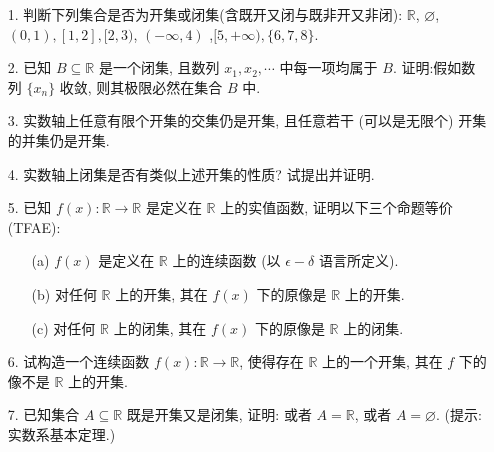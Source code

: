 \begin{enumerate}
    \item[1.]判断下列集合是否为开集或闭集(含既开又闭与既非开又非闭): $\mathbb{R}$, $\displaystyle\varnothing$, $(0,1),[1,2],[2,3)$, $(- \infty ,4)$ ,$[5,+\infty),\{6,7,8\}$.

    \item[2.]已知 $B\subseteq \mathbb{R}$ 是一个闭集, 且数列 $x_{1},x_{2},\cdots$ 中每一项均属于 $B$. 证明:假如数列 $\{x_{n}\}$ 收敛, 则其极限必然在集合 $B$ 中.

    \item[3.]实数轴上任意有限个开集的交集仍是开集, 且任意若干 (可以是无限个) 开集的并集仍是开集.

    \item[4.]实数轴上闭集是否有类似上述开集的性质? 试提出并证明.

    \item[5.]已知 $f(x): \mathbb{R} \to \mathbb{R}$ 是定义在 $\mathbb{R}$ 上的实值函数, 证明以下三个命题等价(TFAE):
        \begin{enumerate}  
            \item[(a)] $f(x)$ 是定义在 $\mathbb{R}$ 上的连续函数 (以 $\epsilon - \delta$ 语言所定义).
            \item[(b)]对任何 $\mathbb{R}$ 上的开集, 其在 $f(x)$ 下的原像是 $\mathbb{R}$ 上的开集.
            \item[(c)]对任何 $\mathbb{R}$ 上的闭集, 其在 $f(x)$ 下的原像是 $\mathbb{R}$ 上的闭集.   
        \end{enumerate}

    \item[6.]试构造一个连续函数 $f(x): \mathbb{R} \to \mathbb{R}$, 使得存在 $\mathbb{R}$ 上的一个开集, 其在 $f$ 下的像不是 $\mathbb{R}$ 上的开集.

    \item[7.]已知集合 $A \subseteq \mathbb{R}$ 既是开集又是闭集, 证明: 或者 $A = \mathbb{R}$, 或者 $A = \varnothing$. (提示: 实数系基本定理.)
\end{enumerate}